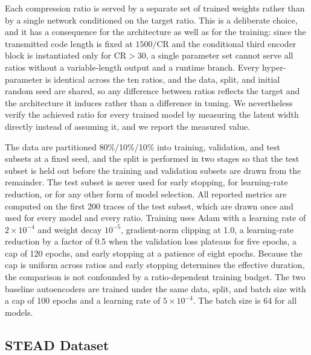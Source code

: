 \documentclass[fleqn,10pt]{wlscirep}
\begin{document}
Each compression ratio is served by a separate set of trained weights rather than by a single network conditioned on the target ratio. This is a deliberate choice, and it has a consequence for the architecture as well as for the training: since the transmitted code length is fixed at $1500/\mathrm{CR}$ and the conditional third encoder block is instantiated only for $\mathrm{CR} > 30$, a single parameter set cannot serve all ratios without a variable-length output and a runtime branch. Every hyper-parameter is identical across the ten ratios, and the data, split, and initial random seed are shared, so any difference between ratios reflects the target and the architecture it induces rather than a difference in tuning. We nevertheless verify the achieved ratio for every trained model by measuring the latent width directly instead of assuming it, and we report the measured value.

The data are partitioned 80\%/10\%/10\% into training, validation, and test subsets at a fixed seed, and the split is performed in two stages so that the test subset is held out before the training and validation subsets are drawn from the remainder. The test subset is never used for early stopping, for learning-rate reduction, or for any other form of model selection. All reported metrics are computed on the first 200 traces of the test subset, which are drawn once and used for every model and every ratio. Training uses Adam with a learning rate of $2\times10^{-4}$ and weight decay $10^{-5}$, gradient-norm clipping at 1.0, a learning-rate reduction by a factor of 0.5 when the validation loss plateaus for five epochs, a cap of 120 epochs, and early stopping at a patience of eight epochs. Because the cap is uniform across ratios and early stopping determines the effective duration, the comparison is not confounded by a ratio-dependent training budget. The two baseline autoencoders are trained under the same data, split, and batch size with a cap of 100 epochs and a learning rate of $5\times10^{-4}$. The batch size is 64 for all models.

\subsection{STEAD Dataset}
\label{subsec:stead}
\end{document}
